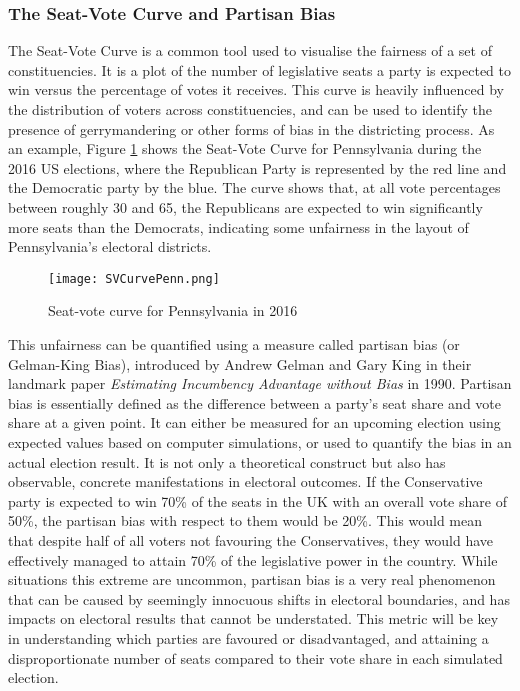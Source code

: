 \documentclass{article}
\begin{document}
\subsubsection{The Seat-Vote Curve and Partisan Bias}

The Seat-Vote Curve is a common tool used to visualise the fairness of a set of constituencies. It is a plot of the number of legislative seats a party 
is expected to win versus the percentage of votes it receives. This curve is heavily influenced by the distribution of voters across constituencies, and
can be used to identify the presence of gerrymandering or other forms of bias in the districting process. As an example, Figure \ref{fig:svcurve} shows the Seat-Vote Curve for
Pennsylvania during the 2016 US elections, where the Republican Party is represented by the red line and the Democratic party by the blue. The curve shows that,
at all vote percentages between roughly 30 and 65, the Republicans are expected to win significantly more seats than the Democrats, indicating some unfairness
in the layout of Pennsylvania's electoral districts.

\begin{figure}[H]
    \centering
    \texttt{[image: SVCurvePenn.png]}
    \caption{Seat-vote curve for Pennsylvania in 2016 \cite{svcurve}}
    \label{fig:svcurve}
\end{figure}

This unfairness can be quantified using a measure called partisan bias (or Gelman-King Bias), introduced by Andrew Gelman and Gary King in their landmark paper
\textit{Estimating Incumbency Advantage without Bias} in 1990. Partisan bias is essentially defined as the difference between a party's seat share and vote share at a given point. It
can either be measured for an upcoming election using expected values based on computer simulations, or used to quantify the bias in an actual election result. 
It is not only a theoretical construct but also has observable, concrete manifestations in electoral outcomes. If the Conservative party is expected to win 70\% of the seats in the UK with an
overall vote share of 50\%, the partisan bias with respect to them would be 20\%. This would mean that despite half of all voters not favouring the Conservatives, they would have effectively
managed to attain 70\% of the legislative power in the country. While situations this extreme are uncommon, partisan bias is a very real phenomenon that can be caused by seemingly innocuous shifts
in electoral boundaries, and has impacts on electoral results that cannot be understated. This metric will be key in understanding which parties are favoured or disadvantaged, and attaining a 
disproportionate number of seats compared to their vote share in each simulated election.
\end{document}
